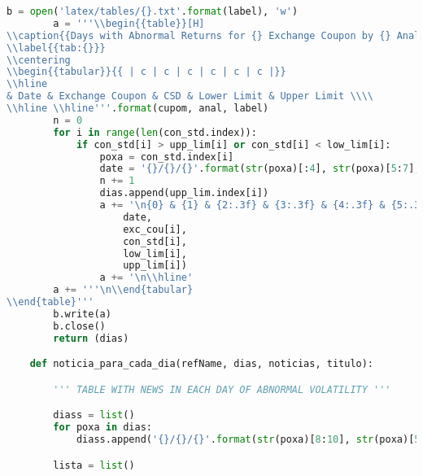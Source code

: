 \begin{lstlisting}[language=Python]
        b = open('latex/tables/{}.txt'.format(label), 'w')
        a = '''\\begin{{table}}[H]
\\caption{{Days with Abnormal Returns for {} Exchange Coupon by {} Analysis}}
\\label{{tab:{}}}
\\centering
\\begin{{tabular}}{{ | c | c | c | c | c | c |}}
\\hline
& Date & Exchange Coupon & CSD & Lower Limit & Upper Limit \\\\
\\hline \\hline'''.format(cupom, anal, label)
        n = 0
        for i in range(len(con_std.index)):
            if con_std[i] > upp_lim[i] or con_std[i] < low_lim[i]:
                poxa = con_std.index[i]
                date = '{}/{}/{}'.format(str(poxa)[:4], str(poxa)[5:7], str(poxa)[8:10])
                n += 1
                dias.append(upp_lim.index[i])
                a += '\n{0} & {1} & {2:.3f} & {3:.3f} & {4:.3f} & {5:.3f}\\\\'.format(n,
                    date,
                    exc_cou[i],
                    con_std[i],
                    low_lim[i],
                    upp_lim[i])
                a += '\n\\hline'
        a += '''\n\\end{tabular}
\\end{table}'''
        b.write(a)
        b.close()
        return (dias)

    def noticia_para_cada_dia(refName, dias, noticias, titulo):

        ''' TABLE WITH NEWS IN EACH DAY OF ABNORMAL VOLATILITY '''

        diass = list()
        for poxa in dias:
            diass.append('{}/{}/{}'.format(str(poxa)[8:10], str(poxa)[5:7], str(poxa)[:4]))

        lista = list()


\end{lstlisting}
